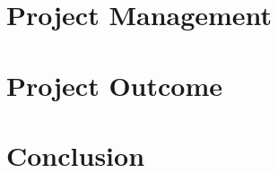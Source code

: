 \documentclass[10pt,a4paper,twoside]{report}
\begin{document}
\begin{multicols}{2}
\chapter{Project Management}
	

\chapter{Project Outcome}
	

\chapter{Conclusion}
	



\end{multicols}
\end{document}
